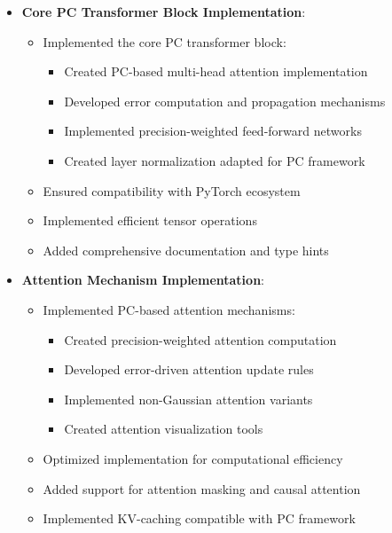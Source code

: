 \documentclass{article}
\begin{document}
\begin{itemize}
  \item \textbf{Core PC Transformer Block Implementation}:
  \begin{itemize}
    \item Implemented the core PC transformer block:
    \begin{itemize}
      \item Created PC-based multi-head attention implementation
      \item Developed error computation and propagation mechanisms
      \item Implemented precision-weighted feed-forward networks
      \item Created layer normalization adapted for PC framework
    \end{itemize}
    \item Ensured compatibility with PyTorch ecosystem
    \item Implemented efficient tensor operations
    \item Added comprehensive documentation and type hints
  \end{itemize}

  \item \textbf{Attention Mechanism Implementation}:
  \begin{itemize}
    \item Implemented PC-based attention mechanisms:
    \begin{itemize}
      \item Created precision-weighted attention computation
      \item Developed error-driven attention update rules
      \item Implemented non-Gaussian attention variants
      \item Created attention visualization tools
    \end{itemize}
    \item Optimized implementation for computational efficiency
    \item Added support for attention masking and causal attention
    \item Implemented KV-caching compatible with PC framework
  \end{itemize}


\end{itemize}
\end{document}
